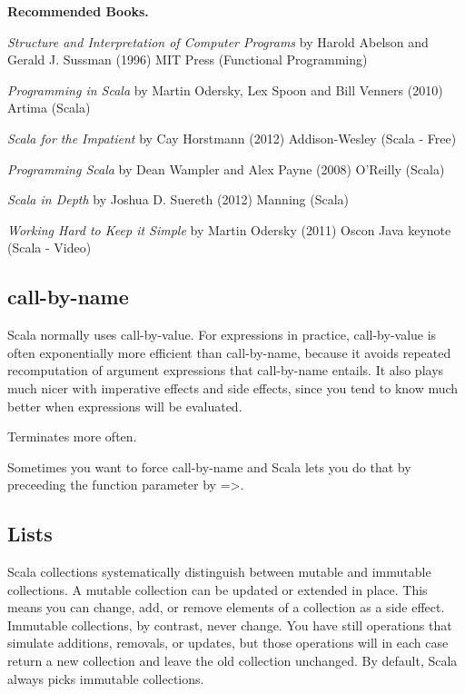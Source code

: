 \documentclass[12pt]{article}
\begin{document}
\textbf{Recommended Books.} 
\begin{list}{*}{
\setlength{\itemsep}{0pt}
\setlength{\parsep}{0pt}
\setlength{\topsep}{0pt}
\setlength{\partopsep}{0pt}
\setlength{\leftmargin}{2em}
\setlength{\labelwidth}{1.5em}
\setlength{\labelsep}{0.5em}
}
\item \textit{Structure and Interpretation of Computer Programs} by Harold Abelson and Gerald J. Sussman (1996) MIT Press (Functional Programming)
\item \textit{Programming in Scala} by Martin Odersky, Lex Spoon and Bill Venners (2010) Artima (Scala)
\item \textit{Scala for the Impatient} by Cay Horstmann (2012) Addison-Wesley (Scala - Free)
\item \textit{Programming Scala} by Dean Wampler and Alex Payne (2008) O’Reilly (Scala)
\item \textit{Scala in Depth} by Joshua D. Suereth (2012) Manning (Scala)
\item \textit{Working Hard to Keep it Simple} by Martin Odersky (2011) Oscon Java keynote (Scala - Video)
\end{list}

\subsection{call-by-name}

Scala normally uses call-by-value. For expressions in practice, call-by-value is often exponentially more efficient than call-by-name, because it avoids repeated recomputation of argument expressions that call-by-name entails. It also plays much nicer with imperative effects and side effects, since you tend to know much better when expressions will be evaluated.

Terminates more often.

Sometimes you want to force call-by-name and Scala lets you do that by preceeding the function parameter by =>.


\subsection{Lists}

Scala collections systematically distinguish between mutable and immutable collections. A mutable collection can be updated or extended in place. This means you can change, add, or remove elements of a collection as a side effect. Immutable collections, by contrast, never change. You have still operations that simulate additions, removals, or updates, but those operations will in each case return a new collection and leave the old collection unchanged. By default, Scala always picks immutable collections.
\end{document}
